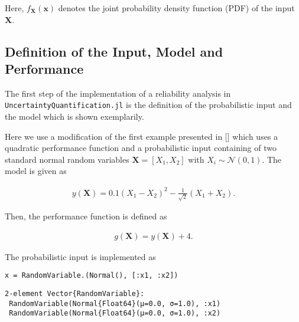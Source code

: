 Here, \(f_{\boldsymbol{X}}(\boldsymbol{x})\) denotes the joint probability density function (PDF) of the input \(\boldsymbol{X}\).



\subsection{Definition of the Input, Model and Performance}



\label{5805987019592958816}{}


The first step of the implementation of a reliability analysis in \texttt{UncertaintyQuantification.jl} is the definition of the probabilistic input and the model which is shown exemplarily.



Here we use a modification of the first example presented in [] which uses a quadratic performance function and a probabilistic input containing of two standard normal random variables \(\boldsymbol{X} = [X_1, X_2]\) with \(X_i \sim \mathcal{N}(0,1)\). The model is given as



\begin{equation*}
\begin{split}y(\boldsymbol{X}) = 0.1(X_1 - X_2)^2 - \frac{1}{\sqrt{2}} (X_1 + X_2).\end{split}\end{equation*}


Then, the performance function is defined as



\begin{equation*}
\begin{split}g(\boldsymbol{X}) = y(\boldsymbol{X}) + 4.\end{split}\end{equation*}


The probabilistic input is implemented as




\begin{verbatim}
x = RandomVariable.(Normal(), [:x1, :x2])
\end{verbatim}


\begin{verbatim}
2-element Vector{RandomVariable}:
 RandomVariable(Normal{Float64}(μ=0.0, σ=1.0), :x1)
 RandomVariable(Normal{Float64}(μ=0.0, σ=1.0), :x2)
\end{verbatim}



